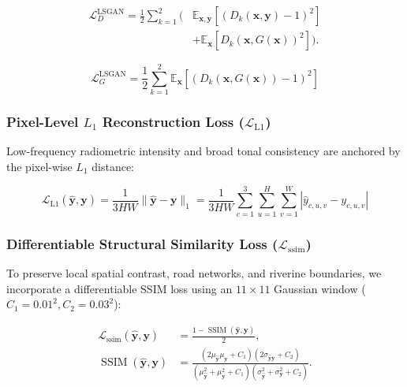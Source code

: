 \documentclass[10pt,a4paper,twoside]{article}
\begin{document}
\begin{equation}
    \begin{aligned}
        \mathcal{L}_D^{\mathrm{LSGAN}} = \frac{1}{2}\sum_{k=1}^{2}\Big(&\mathbb{E}_{\mathbf{x},\mathbf{y}}[(D_k(\mathbf{x},\mathbf{y})-1)^2]\\
        &+\mathbb{E}_{\mathbf{x}}[D_k(\mathbf{x},G(\mathbf{x}))^2]\Big).
    \end{aligned}
    \label{eq:lsgan_d}
\end{equation}

\begin{equation}
    \mathcal{L}_G^{\mathrm{LSGAN}} = \frac{1}{2}\sum_{k=1}^{2} \mathbb{E}_{\mathbf{x}}\!\left[(D_k(\mathbf{x}, G(\mathbf{x})) - 1)^2\right]
    \label{eq:lsgan_g}
\end{equation}

\subsubsection{Pixel-Level \texorpdfstring{$L_1$}{L1} Reconstruction Loss (\texorpdfstring{$\mathcal{L}_{\mathrm{L1}}$}{L1 loss})}
Low-frequency radiometric intensity and broad tonal consistency are anchored by the pixel-wise $L_1$ distance:

\begin{equation}
    \mathcal{L}_{\mathrm{L1}}(\hat{\mathbf{y}}, \mathbf{y}) = \frac{1}{3HW}\|\hat{\mathbf{y}} - \mathbf{y}\|_1 = \frac{1}{3HW}\sum_{c=1}^{3}\sum_{u=1}^{H}\sum_{v=1}^{W} \left|\hat{y}_{c,u,v} - y_{c,u,v}\right|
    \label{eq:l1}
\end{equation}

\subsubsection{Differentiable Structural Similarity Loss (\texorpdfstring{$\mathcal{L}_{\mathrm{ssim}}$}{SSIM loss})}
To preserve local spatial contrast, road networks, and riverine boundaries, we incorporate a differentiable SSIM loss \cite{ref24} using an $11 \times 11$ Gaussian window ($C_1 = 0.01^2, C_2 = 0.03^2$):

\begin{equation}
    \begin{aligned}
        \mathcal{L}_{\mathrm{ssim}}(\hat{\mathbf{y}},\mathbf{y})
        &= \frac{1-\operatorname{SSIM}(\hat{\mathbf{y}},\mathbf{y})}{2},\\
        \operatorname{SSIM}(\hat{\mathbf{y}},\mathbf{y})
        &= \frac{(2\mu_{\hat{\mathbf{y}}}\mu_{\mathbf{y}}+C_1)
        (2\sigma_{\hat{\mathbf{y}}\mathbf{y}}+C_2)}
        {(\mu_{\hat{\mathbf{y}}}^{2}+\mu_{\mathbf{y}}^{2}+C_1)
        (\sigma_{\hat{\mathbf{y}}}^{2}+\sigma_{\mathbf{y}}^{2}+C_2)}.
    \end{aligned}
    \label{eq:ssim}
\end{equation}
\end{document}
